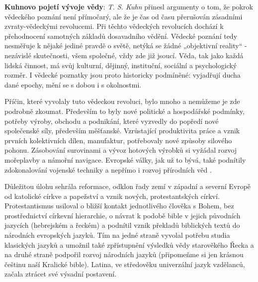     \begin{mdframed}[style=mdnote]
      \begin{note}
        \textbf{Kuhnovo pojetí vývoje vědy}: 
        \emph{T. S. Kuhn} přinesl argumenty o tom, že pokrok vědeckého poznání není přímočarý, ale
        že je čas od času přerušován zásadními zvraty-vědeckými revolucemi. Při těchto vědeckých
        revolucích dochází k přehodnocení samotných základů dosavadního vědění. Vědecké poznání tedy
        nesměřuje k nějaké jediné pravdě o světě, netýká se žádné „objektivní reality“ - nezávislé
        skutečnosti, všem společné, vždy zde již jsoucí. Věda, tak jako každá lidská činnost, má
        svůj kulturní, dějinný, instituční, sociální a psychologický rozměr. I vědecké poznatky jsou
        proto historicky podmíněné: vyjadřují ducha dané epochy, mění se s dobou i s okolnostmi.

        {\centering
        \captionsetup{type=figure} 
        \label{fyz:fig893}
      \par}
      \end{note}
    \end{mdframed}

     Příčin, které vyvolaly tuto vědeckou revoluci, bylo mnoho a nemůžeme je zde podrobně zkoumat.
    Především to byly nové politické a hospodářské podmínky, potřeby výroby, obchodu a podnikání,
    které vyzvedly do popředí nové společenské síly, především měšťanské. Vzrůstající produktivita
    práce a vznik prvních kolektivních dílen, manufaktur, potřebovaly nové způsoby silového pohonu.
    Zásobování surovinami a vývoz hotových výrobků si vyžádal rozvoj mořeplavby a námořní navigace.
    Evropské války, jak už to bývá, také podnítily zdokonalování vojenské techniky a nepřímo i
    rozvoj přírodních věd \cite[s.~137]{Stoll2009}.

    Důležitou úlohu sehrála reformace, odklon řady zemí v západní a severní Evropě od katolické
    církve a papežství a vznik nových, protestantských církví. Protestantismus usiloval o bližší
    kontakt jednotlivého člověka s Bohem, bez prostřednictví církevní hierarchie, o návrat k podobě
    bible v jejich původních jazycích (hebrejském a řeckém) a podnítil vznik překladů biblických
    textů do národních evropských jazyků. Tím na jedné straně vyvolal potřebu studia klasických
    jazyků a umožnil také zpřístupnění výsledků vědy starověkého Řecka a na druhé straně podpořil
    rozvoj národních jazyků (připomeňme si jen krásnou češtinu naší Kralické bible). Latina, ve
    středověku univerzální jazyk vzdělanců, začala ztrácet své výsadní postavení.

